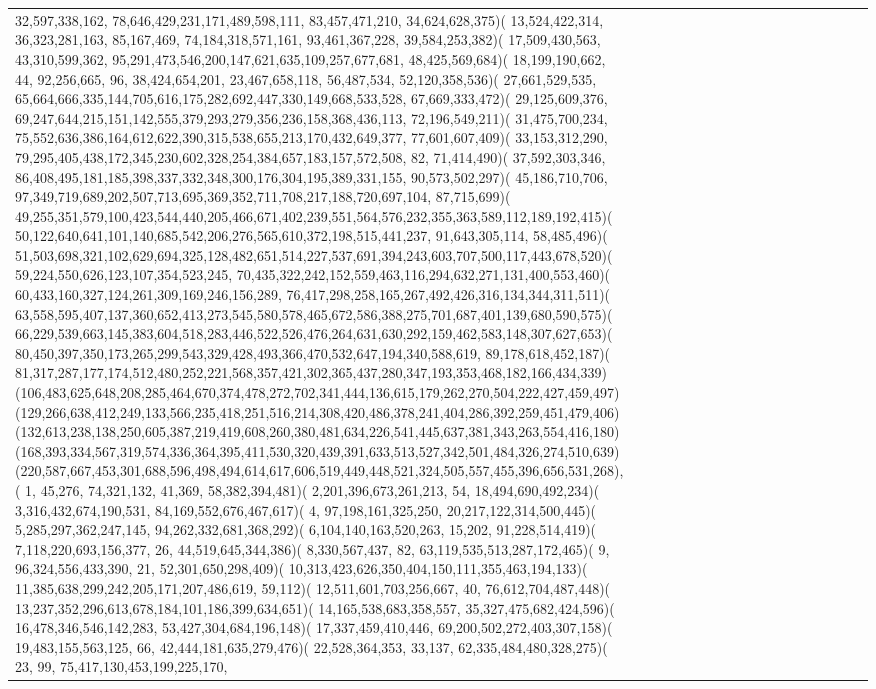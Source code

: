 \documentclass[varwidth=\maxdimen,border=10]{standalone}
\begin{document}
\begin{tabular}{@{}l@{}l@{}l@{}l@{}l@{}l@{}l@{}l@{}l@{}l@{}l@{}l@{}l@{}l@{}l@{}l@{}l@{}l@{}}
32,597,338,162, 78,646,429,231,171,489,598,111, 83,457,471,210, 34,624,628,375)( 13,524,422,314, 36,323,281,163, 85,167,469, 74,184,318,571,161, 93,461,367,228, 39,584,253,382)( 17,509,430,563, 43,310,599,362, 95,291,473,546,200,147,621,635,109,257,677,681, 48,425,569,684)( 18,199,190,662, 44, 92,256,665, 96, 38,424,654,201, 23,467,658,118, 56,487,534, 52,120,358,536)( 27,661,529,535, 65,664,666,335,144,705,616,175,282,692,447,330,149,668,533,528, 67,669,333,472)( 29,125,609,376, 69,247,644,215,151,142,555,379,293,279,356,236,158,368,436,113, 72,196,549,211)( 31,475,700,234, 75,552,636,386,164,612,622,390,315,538,655,213,170,432,649,377, 77,601,607,409)( 33,153,312,290, 79,295,405,438,172,345,230,602,328,254,384,657,183,157,572,508, 82, 71,414,490)( 37,592,303,346, 86,408,495,181,185,398,337,332,348,300,176,304,195,389,331,155, 90,573,502,297)( 45,186,710,706, 97,349,719,689,202,507,713,695,369,352,711,708,217,188,720,697,104, 87,715,699)( 49,255,351,579,100,423,544,440,205,466,671,402,239,551,564,576,232,355,363,589,112,189,192,415)( 50,122,640,641,101,140,685,542,206,276,565,610,372,198,515,441,237, 91,643,305,114, 58,485,496)( 51,503,698,321,102,629,694,325,128,482,651,514,227,537,691,394,243,603,707,500,117,443,678,520)( 59,224,550,626,123,107,354,523,245, 70,435,322,242,152,559,463,116,294,632,271,131,400,553,460)( 60,433,160,327,124,261,309,169,246,156,289, 76,417,298,258,165,267,492,426,316,134,344,311,511)( 63,558,595,407,137,360,652,413,273,545,580,578,465,672,586,388,275,701,687,401,139,680,590,575)( 66,229,539,663,145,383,604,518,283,446,522,526,476,264,631,630,292,159,462,583,148,307,627,653)( 80,450,397,350,173,265,299,543,329,428,493,366,470,532,647,194,340,588,619, 89,178,618,452,187)( 81,317,287,177,174,512,480,252,221,568,357,421,302,365,437,280,347,193,353,468,182,166,434,339)(106,483,625,648,208,285,464,670,374,478,272,702,341,444,136,615,179,262,270,504,222,427,459,497)(129,266,638,412,249,133,566,235,418,251,516,214,308,420,486,378,241,404,286,392,259,451,479,406)(132,613,238,138,250,605,387,219,419,608,260,380,481,634,226,541,445,637,381,343,263,554,416,180)(168,393,334,567,319,574,336,364,395,411,530,320,439,391,633,513,527,342,501,484,326,274,510,639)(220,587,667,453,301,688,596,498,494,614,617,606,519,449,448,521,324,505,557,455,396,656,531,268), (  1, 45,276, 74,321,132, 41,369, 58,382,394,481)(  2,201,396,673,261,213, 54, 18,494,690,492,234)(  3,316,432,674,190,531, 84,169,552,676,467,617)(  4, 97,198,161,325,250, 20,217,122,314,500,445)(  5,285,297,362,247,145, 94,262,332,681,368,292)(  6,104,140,163,520,263, 15,202, 91,228,514,419)(  7,118,220,693,156,377, 26, 44,519,645,344,386)(  8,330,567,437, 82, 63,119,535,513,287,172,465)(  9, 96,324,556,433,390, 21, 52,301,650,298,409)( 10,313,423,626,350,404,150,111,355,463,194,133)( 11,385,638,299,242,205,171,207,486,619, 59,112)( 12,511,601,703,256,667, 40, 76,612,704,487,448)( 13,237,352,296,613,678,184,101,186,399,634,651)( 14,165,538,683,358,557, 35,327,475,682,424,596)( 16,478,346,546,142,283, 53,427,304,684,196,148)( 17,337,459,410,446, 69,200,502,272,403,307,158)( 19,483,155,563,125, 66, 42,444,181,635,279,476)( 22,528,364,353, 33,137, 62,335,484,480,328,275)( 23, 99, 75,417,130,453,199,225,170, 
\end{tabular}
\end{document}
